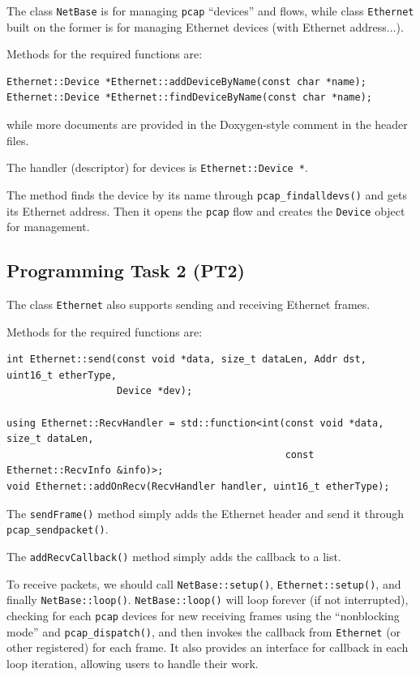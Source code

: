 \documentclass[a4paper]{article}
\begin{document}
  The class \texttt{NetBase} is for managing \texttt{pcap} ``devices'' and flows, while class \texttt{Ethernet} built on the former is for managing Ethernet devices (with Ethernet address...).

  Methods for the required functions are:
  \begin{verbatim}
Ethernet::Device *Ethernet::addDeviceByName(const char *name);
Ethernet::Device *Ethernet::findDeviceByName(const char *name);
  \end{verbatim}
  while more documents are provided in the Doxygen-style comment in the header files.

  The handler (descriptor) for devices is \texttt{Ethernet::Device *}.

  The method finds the device by its name through \texttt{pcap\_findalldevs()} and gets its Ethernet address.
  Then it opens the \texttt{pcap} flow and creates the \texttt{Device} object for management.

  \subsection{Programming Task 2 (PT2)}

  The class \texttt{Ethernet} also supports sending and receiving Ethernet frames.

  Methods for the required functions are:
  \begin{verbatim}
int Ethernet::send(const void *data, size_t dataLen, Addr dst, uint16_t etherType,
                   Device *dev);

using Ethernet::RecvHandler = std::function<int(const void *data, size_t dataLen,
                                                const Ethernet::RecvInfo &info)>;
void Ethernet::addOnRecv(RecvHandler handler, uint16_t etherType);
  \end{verbatim}

  The \texttt{sendFrame()} method simply adds the Ethernet header and send it through \texttt{pcap\_sendpacket()}.

  The \texttt{addRecvCallback()} method simply adds the callback to a list.

  To receive packets, we should call \texttt{NetBase::setup()}, \texttt{Ethernet::setup()}, and finally \texttt{NetBase::loop()}.
  \texttt{NetBase::loop()} will loop forever (if not interrupted), checking for each \texttt{pcap} devices for new receiving frames using the ``nonblocking mode'' and \texttt{pcap\_dispatch()}, and then invokes the callback from \texttt{Ethernet} (or other registered) for each frame.
  It also provides an interface for callback in each loop iteration, allowing users to handle their work.
\end{document}
